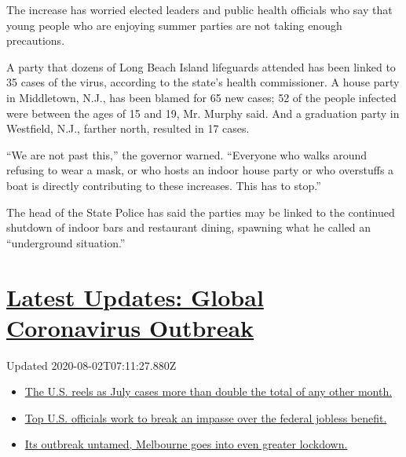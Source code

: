 The increase has worried elected leaders and public health officials who
say that young people who are enjoying summer parties are not taking
enough precautions.

A party that dozens of Long Beach Island lifeguards attended has been
linked to 35 cases of the virus, according to the state's health
commissioner. A house party in Middletown, N.J., has been blamed for 65
new cases; 52 of the people infected were between the ages of 15 and 19,
Mr. Murphy said. And a graduation party in Westfield, N.J., farther
north, resulted in 17 cases.

``We are not past this,'' the governor warned. ``Everyone who walks
around refusing to wear a mask, or who hosts an indoor house party or
who overstuffs a boat is directly contributing to these increases. This
has to stop.''

The head of the State Police has said the parties may be linked to the
continued shutdown of indoor bars and restaurant dining, spawning what
he called an ``underground situation.''

\hypertarget{latest-updates-global-coronavirus-outbreak}{%
\section{\texorpdfstring{\href{https://www.nytimes.com/2020/08/01/world/coronavirus-covid-19.html?action=click\&pgtype=Article\&state=default\&region=MAIN_CONTENT_1\&context=storylines_live_updates}{Latest
Updates: Global Coronavirus
Outbreak}}{Latest Updates: Global Coronavirus Outbreak}}\label{latest-updates-global-coronavirus-outbreak}}

Updated 2020-08-02T07:11:27.880Z

\begin{itemize}
\tightlist
\item
  \href{https://www.nytimes.com/2020/08/01/world/coronavirus-covid-19.html?action=click\&pgtype=Article\&state=default\&region=MAIN_CONTENT_1\&context=storylines_live_updates\#link-34047410}{The
  U.S. reels as July cases more than double the total of any other
  month.}
\item
  \href{https://www.nytimes.com/2020/08/01/world/coronavirus-covid-19.html?action=click\&pgtype=Article\&state=default\&region=MAIN_CONTENT_1\&context=storylines_live_updates\#link-780ec966}{Top
  U.S. officials work to break an impasse over the federal jobless
  benefit.}
\item
  \href{https://www.nytimes.com/2020/08/01/world/coronavirus-covid-19.html?action=click\&pgtype=Article\&state=default\&region=MAIN_CONTENT_1\&context=storylines_live_updates\#link-2bc8948}{Its
  outbreak untamed, Melbourne goes into even greater lockdown.}
\end{itemize}

